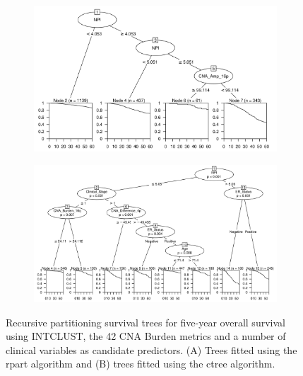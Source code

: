 \begin{figure}[!htb]
\centering

\vspace{1cm}

\begin{subfigure}{\textwidth}
\subcaption{}
\includegraphics[width=1\textwidth]{../figures/Appendices/Appendix_B/Clin_PA_PartyKit_Survival_Burden_FiveYearOS_INTCLUST.png}
\end{subfigure}

\vspace{2cm}

\begin{subfigure}{\textwidth}
\subcaption{}
\includegraphics[width=1\textwidth]{../figures/Appendices/Appendix_B/Clin_PA_Ctree_Survival_Burden_FiveYearOS_INTCLUST.png}
\end{subfigure}

\vspace{1cm}

\caption[Recursive partitioning survival trees for five-year overall survival using INTCLUST, the 42 CNA Burden metrics and a number of clinical variables as candidate predictors.]{Recursive partitioning survival trees for five-year overall survival using INTCLUST, the 42 CNA Burden metrics and a number of clinical variables as candidate predictors. (A) Trees fitted using the rpart algorithm and (B) trees fitted using the ctree algorithm.}
\end{figure}


